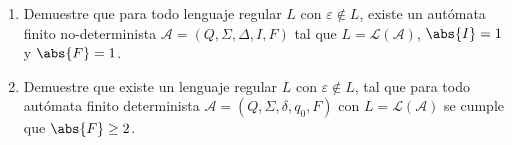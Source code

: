 \documentclass{homework}
\begin{document}
\begin{p2}
    \begin{prob}[2]
        \begin{enumerate}
            \item Demuestre que para todo lenguaje regular \(L\) con \(\varepsilon\notin L\), existe un autómata finito no-determinista \(\mathcal{A}=(Q,\Sigma,\Delta, I, F)\) tal que \(L=\mathcal{L}(\mathcal{A})\), \(\abs{I}=1\) y \(\abs{F}=1\).
            \item Demuestre que existe un lenguaje regular \(L\) con \(\varepsilon\notin L\), tal que para todo autómata finito determinista \(\mathcal{A}=(Q,\Sigma,\delta, q_0, F)\) con \(L=\mathcal{L}(\mathcal{A})\) se cumple que \(\abs{F}\geq 2\).
        \end{enumerate}
    \end{prob}
    

\end{p2}
\end{document}
